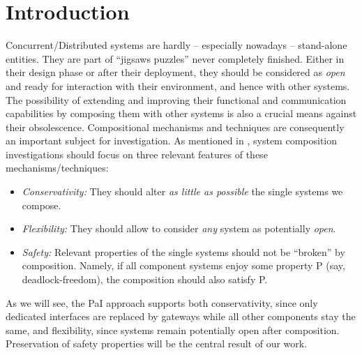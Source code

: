 \section{Introduction}
\label{sec:Intro}
Concurrent/Distributed systems are  hardly -- especially nowadays -- 
stand-alone entities. They are part of 
``jigsaws puzzles''  
never completely  finished.
Either in their design phase or after their deployment, they should be considered
as {\em open} and  ready for interaction with their environment, and hence with other systems. 
The possibility of extending and improving their functional and communication capabilities
by composing them
with other systems is also a crucial means %
against their obsolescence.
Compositional mechanisms and techniques are consequently an important subject for investigation.
As mentioned in \cite{BDGY23}, system composition investigations should focus on three relevant features
of these mechanisms/techniques:
\begin{itemize}
\item
{\em Conservativity:} 
They should alter {\em as little as possible} the single systems we compose.
\item
{\em Flexibility:} 
%
 They should allow to consider {\em any} system as potentially {\em open}.
\item
{\em Safety:}
Relevant properties of the single systems should not be ``broken'' by composition.
 Namely, if all component systems enjoy some property P (say, deadlock-freedom), the composition should also satisfy P. 
\end{itemize} 


As we will see, the PaI approach supports both conservativity, since only dedicated interfaces are replaced by gateways while all other components stay  the same,   %
and flexibility,  since systems remain potentially open after composition.
Preservation of safety properties will be the central result of our work.




